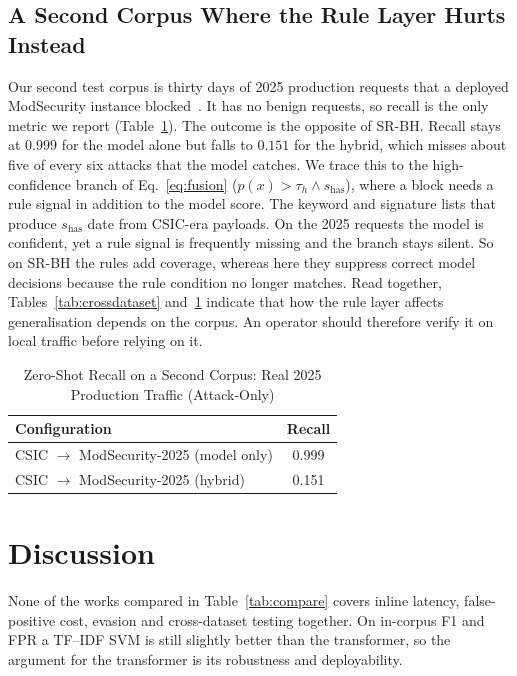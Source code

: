 \documentclass[conference]{IEEEtran}
\begin{document}
\subsection{A Second Corpus Where the Rule Layer Hurts Instead}
\label{sec:thirdcorpus}
Our second test corpus is thirty days of 2025 production requests that a
deployed ModSecurity instance blocked~\cite{modsec30day2025}. It has no
benign requests, so recall is the only metric we report
(Table~\ref{tab:thirdcorpus}). The outcome is the opposite of SR-BH. Recall
stays at $0.999$ for the model alone but falls to $0.151$ for the hybrid,
which misses about five of every six attacks that the model catches. We
trace this to the high-confidence branch of Eq.~\eqref{eq:fusion}
($p(x){>}\tau_h \wedge s_{\text{has}}$), where a block needs a rule signal
in addition to the model score. The keyword and signature lists that
produce $s_{\text{has}}$ date from CSIC-era payloads. On the 2025 requests
the model is confident, yet a rule signal is frequently missing and the
branch stays silent. So on SR-BH the rules add coverage, whereas here they
suppress correct model decisions because the rule condition no longer
matches. Read together, Tables~\ref{tab:crossdataset}
and~\ref{tab:thirdcorpus} indicate that how the rule layer affects
generalisation depends on the corpus. An operator should therefore verify
it on local traffic before relying on it.

\begin{table}[t]
\centering
\caption{Zero-Shot Recall on a Second Corpus: Real 2025 Production Traffic (Attack-Only)}
\label{tab:thirdcorpus}
\begin{tabular}{@{}lc@{}}
\toprule
Configuration & Recall \\
\midrule
CSIC $\to$ ModSecurity-2025 (model only) & 0.999 \\
CSIC $\to$ ModSecurity-2025 (hybrid) & 0.151 \\
\bottomrule
\end{tabular}
\end{table}

\section{Discussion}
\label{sec:discussion}
None of the works compared in Table~\ref{tab:compare} covers inline
latency, false-positive cost, evasion and cross-dataset testing together.
On in-corpus F1 and FPR a TF--IDF SVM is still slightly better than the
transformer, so the argument for the transformer is its robustness and
deployability.
\end{document}
